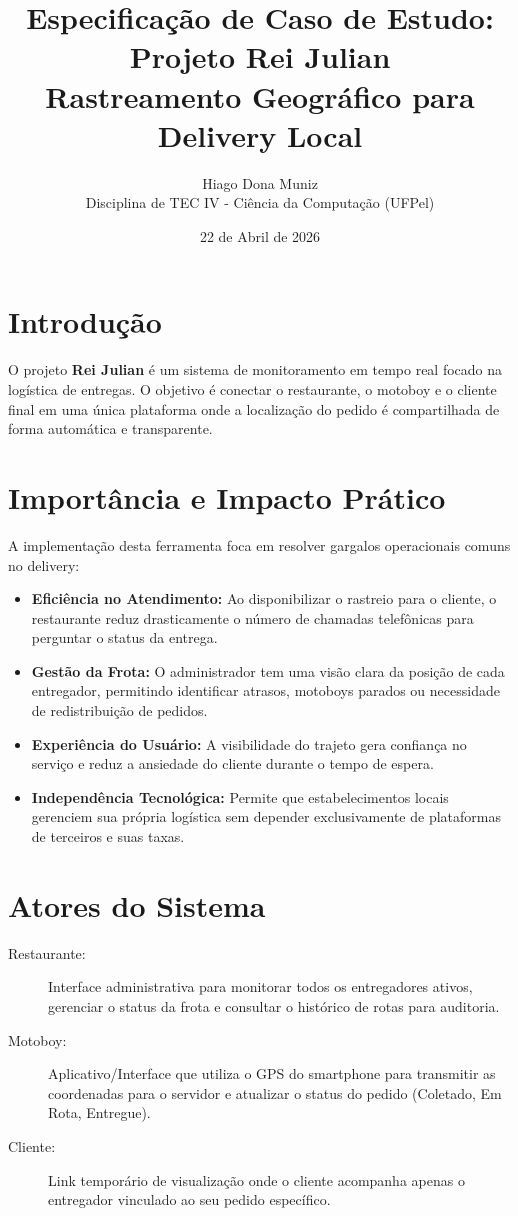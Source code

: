 \documentclass[12pt,a4paper]{article}
\title{Especificação de Caso de Estudo: Projeto Rei Julian \\ \large Rastreamento Geográfico para Delivery Local}
\author{Hiago Dona Muniz \\ \small Disciplina de TEC IV - Ciência da Computação (UFPel)}
\date{22 de Abril de 2026}
\begin{document}
\maketitle

\section{Introdução}
O projeto \textbf{Rei Julian} é um sistema de monitoramento em tempo real focado na logística de entregas. O objetivo é conectar o restaurante, o motoboy e o cliente final em uma única plataforma onde a localização do pedido é compartilhada de forma automática e transparente.

\section{Importância e Impacto Prático}
A implementação desta ferramenta foca em resolver gargalos operacionais comuns no delivery:
\begin{itemize}
    \item \textbf{Eficiência no Atendimento:} Ao disponibilizar o rastreio para o cliente, o restaurante reduz drasticamente o número de chamadas telefônicas para perguntar o status da entrega.
    \item \textbf{Gestão da Frota:} O administrador tem uma visão clara da posição de cada entregador, permitindo identificar atrasos, motoboys parados ou necessidade de redistribuição de pedidos.
    \item \textbf{Experiência do Usuário:} A visibilidade do trajeto gera confiança no serviço e reduz a ansiedade do cliente durante o tempo de espera.
    \item \textbf{Independência Tecnológica:} Permite que estabelecimentos locais gerenciem sua própria logística sem depender exclusivamente de plataformas de terceiros e suas taxas.
\end{itemize}

\section{Atores do Sistema}
\begin{description}
    \item[Restaurante:] Interface administrativa para monitorar todos os entregadores ativos, gerenciar o status da frota e consultar o histórico de rotas para auditoria.
    \item[Motoboy:] Aplicativo/Interface que utiliza o GPS do smartphone para transmitir as coordenadas para o servidor e atualizar o status do pedido (Coletado, Em Rota, Entregue).
    \item[Cliente:] Link temporário de visualização onde o cliente acompanha apenas o entregador vinculado ao seu pedido específico.
\end{description}
\end{document}
